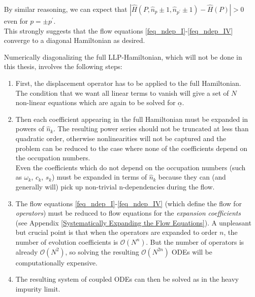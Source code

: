 By similar reasoning, we can expect that $|\hat H(P,\hat n_p\pm1,\hat n_{p^\prime}\pm 1)-\hat H(P)|>0$ even for $p=\pm p^\prime$.\\
This strongly suggests that the flow equations \ref{feq_ndep_I}-\ref{feq_ndep_IV} converge to a diagonal Hamiltonian as desired. \par
Numerically diagonalizing the full LLP-Hamiltonian, which will not be done in this thesis, involves the following steps: 
\begin{enumerate}
\item First, the displacement operator has to be applied to the full Hamiltonian. The condition that we want all linear terms to vanish will give a set of $N$ non-linear equations which are again to be solved for $\underline\alpha$. 
\item Then each coefficient appearing in the full Hamiltonian must be expanded in powers of $\hat n_k$. The resulting power series should not be truncated at less than quadratic order, otherwise nonlinearities will not be captured and the problem can be reduced to the case where none of the coefficients depend on the occupation numbers. \\ Even the coefficients which do not depend on the occupation numbers (such as $\omega_k$, $c_k$, $s_k$) must be expanded in terms of $\hat n_k$ because they can (and generally will) pick up non-trivial n-dependencies during the flow.
\item The flow equations \ref{feq_ndep_I}-\ref{feq_ndep_IV} (which define the flow for \emph{operators}) must be reduced to flow equations for the \emph{expansion coefficients} (see Appendix \ref{Systematically Expanding the Flow Equations}). A unpleasant but crucial point is that when the operators are expanded to order $n$, the number of evolution coefficients is $\mathcal O(N^n)$. But the number of operators is already $\mathcal O(N^2)$, so solving the resulting $\mathcal O(N^{2n})$ ODEs will be computationally expensive.
\item The resulting system of coupled ODEs can then be solved as in the heavy impurity limit.
\end{enumerate}





























































